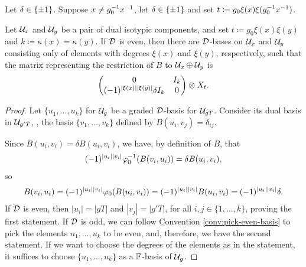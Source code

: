 \begin{prop}
    Let $\delta \in \{ \pm 1 \}$. 
    Suppose $x \neq g_0^{-1} x^{-1}$, let $\delta \in \{ \pm 1 \}$ and  set $t \coloneqq g_0\xi(x)\xi(g_0^{-1} x^{-1})$. 

    Let $\mathcal U_{x}$ and $\mathcal U_{y}$ be a pair of dual isotypic components, and set $t \coloneqq g_0 \xi(x) \xi(y)$ and $k \coloneqq \kappa(x) = \kappa(y)$. 
    If $\mathcal{D}$ is even, then there are $\mathcal{D}$-bases on $\mathcal U_{x}$ and $\mathcal U_{y}$ consisting only of elements with degrees $\xi(x)$ and $\xi(y)$, respectively, such that the matrix representing the restriction of $B$ to $\mathcal U_{x} \oplus \mathcal U_{y}$ is 
    \[\begin{pmatrix}
        0 & I_k\\
        (-1)^{|\xi(x)||\xi(y)|} \delta I_k & 0
    \end{pmatrix} \otimes X_t.\]
\end{prop}

\begin{proof}
    Let $\{ u_1, \ldots , u_k \}$ for $\mathcal U_g$ be a graded $\mathcal{D}$-basis for $\mathcal U_{gT}$. 
    Consider its dual basis in $\mathcal U_{g'T}$, \ie, the basis $\{ v_1, \ldots , v_k \}$ defined by $B(u_i, v_j) = \delta_{ij}$. 
    
    Since $\overline B(u_i, v_i) = \delta B(u_i, v_i)$, we have, by definition of $\overline{B}$, that
    \begin{align*}
        (-1)^{|u_i||v_i|} \varphi_0^{-1} ( B(v_i, u_i) ) = \delta B(u_i, v_i),
    \end{align*}
    so
    \begin{align*}
        B(v_i, u_i) = (-1)^{|u_i||v_i|} \varphi_0 ( B(u_i, v_i) ) = (-1)^{|u_i||v_i|} B(u_i, v_i) = (-1)^{|u_i||v_i|} \delta.
    \end{align*}
    If $\mathcal{D}$ is even, then $|u_i| = |gT|$ and $|v_j| = |g' T|$, for all $i,j \in \{1, \ldots, k\}$, proving the first statement. 
    If $\mathcal{D}$ is odd, we can follow Convention \ref{conv:pick-even-basis} to pick the elements $u_1, \ldots , u_k$ to be even, and, therefore, we have the second statement. 
    If we want to choose the degrees of the elements as in the statement, it suffices to choose $\{u_1, \ldots, u_k\}$ as a $\mathbb{F}$-basis of $\mathcal U_g$.
\end{proof}


